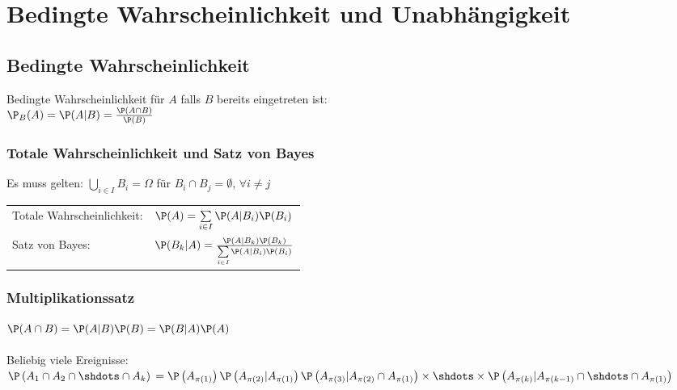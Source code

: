 \documentclass[german,color,6pt]{latex4ei/latex4ei_sheet}
\begin{document}
\section{Bedingte Wahrscheinlichkeit und \newline Unabhängigkeit}
\begin{sectionbox}
	\subsection{Bedingte Wahrscheinlichkeit}
	Bedingte Wahrscheinlichkeit für $A$ falls $B$ bereits eingetreten ist:\\
	$\P_B(A) = \P(A|B) = \frac{\P(A \cap B)}{\P(B)}$\\ %

	\subsubsection{Totale Wahrscheinlichkeit und Satz von Bayes}
	Es muss gelten: $\bigcup\limits_{i \in I} B_i = \Omega$ für $B_i \cap B_j = \emptyset$, $\forall i \neq j$ \\
	\begin{tabular}{ll}
		Totale Wahrscheinlichkeit: & $\P(A) = \sum\limits_{i \in I} \P(A|B_i)\P(B_i)$\\
		Satz von Bayes: & $\P(B_k | A) = \frac{\P(A | B_k)\P(B_k)}{\sum\limits_{i \in I} \P(A|B_i) \P(B_i)}$\\
	\end{tabular}


	\subsubsection{Multiplikationssatz}
	$\P(A \cap B) = \P(A|B)\P(B) = \P(B|A)\P(A)$
	\\ \\
	Beliebig viele Ereignisse:\\
	$\P\left(A_1 \cap A_2 \cap \shdots \cap A_k\right) \newline
	= \P\left(A_{\pi(1)}\right)\P\left(A_{\pi(2)}|A_{\pi(1)}\right)\P\left(A_{\pi(3)}|A_{\pi(2)} \cap A_{\pi(1)}\right) \times \newline
	\shdots \times \P\left(A_{\pi(k)}|A_{\pi(k-1)} \cap \shdots \cap A_{\pi(1)}\right)$
\end{sectionbox}
\end{document}
